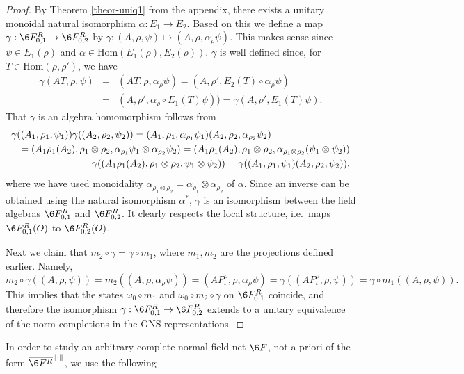 \documentclass[11pt]{article}
\theoremstyle{definition}
\theoremstyle{definition}
\theoremstyle{remark}
\newcommand{\Hom}{\mathrm{Hom}}
\newcommand{\rarr}{\rightarrow}
\begin{document}
\begin{proof} By Theorem \ref{theor-uniq1} from the
  appendix, there exists a unitary monoidal natural
  isomorphism $\alpha: E_1\rarr E_2$. Based on this we
  define a map $\gamma:\6F^R_{0,1}\rarr\6F^R_{0,2}$ by
  $\gamma:(A,\rho,\psi)\mapsto(A,\rho,\alpha_\rho\psi)$. This
  makes sense since $\psi\in E_1(\rho)$ and
  $\alpha\in\Hom(E_1(\rho),E_2(\rho))$. $\gamma$ is
  well defined since, for $T\in\Hom(\rho,\rho')$, we
  have
\begin{eqnarray*} \gamma(AT,\rho,\psi)&=&(AT,\rho,\alpha_\rho\psi)=(A,\rho',E_2(T)\circ\alpha_\rho\psi)\\
  &=& (A,\rho',\alpha_\rho\circ E_1(T)\psi))=\gamma(A,\rho',E_1(T)\psi). \end{eqnarray*}
That $\gamma$ is an algebra homomorphism follows from
\begin{eqnarray*} \lefteqn{ \gamma((A_1,\rho_1,\psi_1))\gamma((A_2,\rho_2,\psi_2)) =
   (A_1,\rho_1,\alpha_{\rho_1}\psi_1)(A_2,\rho_2,\alpha_{\rho_2}\psi_2) } \\
   &&= (A_1\rho_1(A_2),\rho_1\otimes\rho_2,\alpha_{\rho_1}\psi_1\otimes\alpha_{\rho_2}\psi_2) 
   = (A_1\rho_1(A_2),\rho_1\otimes\rho_2,\alpha_{\rho_1\otimes\rho_2}(\psi_1\otimes\psi_2)) \\
   &&= \gamma((A_1\rho_1(A_2),\rho_1\otimes\rho_2,\psi_1\otimes\psi_2)) 
   = \gamma((A_1,\rho_1,\psi_1)(A_2,\rho_2,\psi_2)),
\end{eqnarray*}
where we have used monoidality $\alpha_{\rho_1\otimes\rho_2}=\alpha_{\rho_1}\otimes\alpha_{\rho_2}$
of $\alpha$. Since an inverse can be obtained using the natural isomorphism $\alpha^*$, $\gamma$ is
an isomorphism between the field algebras $\6F^R_{0,1}$ and $\6F^R_{0,2}$. It clearly respects the
local structure, i.e.\ maps $\6F^R_{0,1}(O)$ to $\6F^R_{0,2}(O)$.

Next we claim that $m_2\circ\gamma=\gamma\circ m_1$, where $m_1,m_2$ are the projections defined
earlier. Namely, 
\[ m_2\circ\gamma((A,\rho,\psi)) = m_2((A,\rho,\alpha_\rho\psi))
   =(AP^\rho_\iota,\rho,\alpha_\rho\psi)  =\gamma((AP^\rho_\iota,\rho,\psi))
  =\gamma\circ m_1((A,\rho,\psi)).
\]
This implies that the states $\omega_0\circ m_1$ and $\omega_0\circ m_2\circ\gamma$ on $\6F^R_{0,1}$
coincide, and therefore the isomorphism $\gamma:\6F^R_{0,1}\rarr\6F^R_{0,2}$ extends to a unitary
equivalence of the norm completions in the GNS representations.
\end{proof}

In order to study an arbitrary complete normal field net $\6F$, not a priori of the form
$\overline{\6F^R}^{\|\cdot\|}$, we use the following
\end{document}
